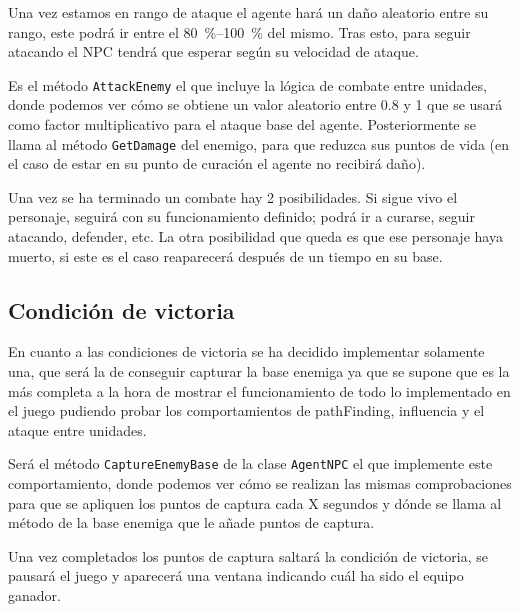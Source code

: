 Una vez estamos en rango de ataque el agente hará un daño aleatorio entre su rango, este podrá ir entre el \qtyrange[range-phrase=~~--~, range-units=single]{80}{100}{\percent} del mismo. Tras esto, para seguir atacando el NPC tendrá que esperar según su velocidad de ataque.

Es el método \texttt{AttackEnemy} el que incluye la lógica de combate entre unidades, donde podemos ver cómo se obtiene un valor aleatorio entre 0.8 y 1 que se usará como factor multiplicativo para el ataque base del agente. Posteriormente se llama al método \texttt{GetDamage} del enemigo, para que reduzca sus puntos de vida (en el caso de estar en su punto de curación el agente no recibirá daño). 



Una vez se ha terminado un combate hay 2 posibilidades. Si sigue vivo el personaje, seguirá con su funcionamiento definido; podrá ir a curarse, seguir atacando, defender, etc. La otra posibilidad que queda es que ese personaje haya muerto, si este es el caso reaparecerá después de un tiempo en su base.

\subsection{Condición de victoria}

En cuanto a las condiciones de victoria se ha decidido implementar solamente una, que será la de conseguir capturar la base enemiga ya que  se supone que es la más completa a la hora de mostrar el funcionamiento de todo lo implementado en el juego pudiendo probar los comportamientos de pathFinding, influencia y el ataque entre unidades.

Será el método \texttt{CaptureEnemyBase} de la clase \texttt{AgentNPC} el que implemente este comportamiento, donde podemos ver cómo se realizan las mismas comprobaciones para que se apliquen los puntos de captura cada X segundos y  dónde se llama al método de la base enemiga que le añade puntos de captura.



Una vez completados los puntos de captura saltará la condición de victoria, se pausará el juego y aparecerá una ventana indicando cuál ha sido el equipo ganador. 